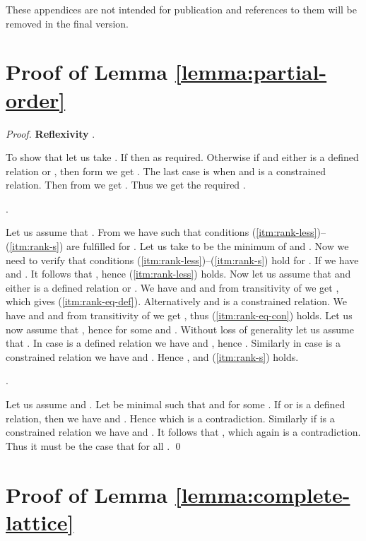 These appendices are not intended for publication and references to
them will be removed in the final version.

\section{Proof of Lemma \ref{lemma:partial-order}}\label{proof:lemma:partial-order}

\begin{proof}

{\bf Reflexivity} .

\noindent To show that  let us take . If  then  as required. Otherwise
if  and either  is a defined relation or , then
form  we get . The last case is when  and  is a
constrained relation. Then from  we get
. Thus we get the required .

 .

\noindent Let us assume that . From  we have  such that conditions
(\ref{itm:rank-less})--(\ref{itm:rank-s}) are fulfilled for
. Let us take  to be the minimum of  and . Now we
need to verify that conditions
(\ref{itm:rank-less})--(\ref{itm:rank-s}) hold for . If 
we have  and . It follows that , hence
(\ref{itm:rank-less}) holds. Now let us assume that  and
either  is a defined relation or . We have  and  and
from transitivity of  we get , which gives (\ref{itm:rank-eq-def}). Alternatively
 and  is a constrained relation. We have  and  and
from transitivity of  we get , thus (\ref{itm:rank-eq-con}) holds. Let us now assume
that , hence  for some
 and . Without loss of generality let us assume that
. In case  is a defined relation we
have  and , hence . Similarly in case  is a constrained relation we have
 and . Hence , and
(\ref{itm:rank-s}) holds.

 .

\noindent Let us assume  and
. Let  be minimal such that
 and  for some . If  or  is a defined relation, then we have  and .
Hence  which is a
contradiction. Similarly if  is a constrained relation we have
 and . It follows that , which
again is a contradiction. Thus it must be the case that  for all .
\qed
\end{proof}

\section{Proof of Lemma \ref{lemma:complete-lattice}}\label{proof:lemma:complete-lattice}

